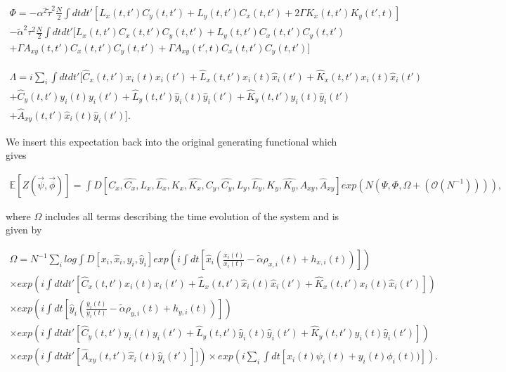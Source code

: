 \documentclass[.../main.tex]{subfiles}
\begin{document}
\begin{equation}
	\begin{split}
		\Phi = - \alpha^2 \tilde{\tau}^2 \frac{N}{2} \int dt dt'[L_x(t, t')C_y(t, t')
		+ L_y(t, t')C_x(t, t') + 2 \Gamma K_x(t, t') K_y(t', t)] \\
	- \tilde{\alpha}^2 \tau^2 \frac{N}{2} \int dtdt' [L_x(t, t') C_x(t, t') C_y(t, t') + L_y(t, t')
	C_x(t, t') C_y(t, t') \\ + \Gamma A_{xy}(t, t') C_x(t, t') C_y(t, t') + \Gamma A_{xy}(t', t) C_x
	(t, t') C_y(t, t')] 
\end{split}
\end{equation}

\begin{equation}
	\begin{split}
		\Lambda = i \sum_i \int dt dt'[\hat{C}_x(t, t') x_i(t) x_i(t') + \hat{L}_x(t, t') \hat{x}_i
		(t)\hat{x}_i(t') + \hat{K}_x(t, t') x_i(t) \hat{x}_i(t') \\ + \hat{C}_y(t, t') y_i(t) y_i
		(t') +
		\hat{L}_y(t, t') \hat{y}_i
		(t)\hat{y}_i(t') + \hat{K}_y(t, t') y_i(t) \hat{y}_i(t') \\ 
		+ \hat{A}_{xy}(t, t') \hat{x}_i(t) \hat{y}_i(t')].
	\end{split}
\end{equation}

We insert this expectation back into the original generating functional which gives

\begin{equation}
	\begin{split}
		\mathbb{E}[Z(\Vec{\psi}, \Vec{\phi})] = \int D[C_x, \hat{C_x}, L_x, \hat{L_x}, K_x, 
		\hat{K_x}, C_y, \hat{C_y}, L_y, \hat{L_y}, K_y, 
		\hat{K_y}, A_{xy}, \hat{A}_{xy}] 
		exp(N(\Psi, \Phi, \Omega + (\mathcal{O}(N^{-1})))),
	\end{split}
\end{equation}

where $\Omega$ includes all terms describing the time evolution of the system and is given by

\begin{equation}
	\begin{split}
		\Omega = N^{-1} \sum_i log \int D[x_i, \hat{x}_i, y_i, \hat{y}_i] exp(i
		\int dt[\hat{x}_i
		(\frac{\dot{x_i}(t)}{x_i(t)}
			- \tilde{\alpha} \rho_{x, i}(t) + h_{x, i}(t))]) 
			\\
		\times exp(i\int dt dt'[\hat{C}_x(t, t') x_i(t) x_i(t') + \hat{L}_x(t, t') \hat{x}_i
		(t)\hat{x}_i(t') + \hat{K}_x(t, t') x_i(t) \hat{x}_i(t')])\\
		\times exp(i \int dt[\hat{y}_i
		(\frac{\dot{y_i}(t)}{y_i(t)} 
			- \tilde{\alpha} \rho_{y, i}(t) + h_{y, i}(t))])\\
		\times exp(i \int dt dt' [\hat{C}_y(t, t') y_i(t) y_i
		(t') +
		\hat{L}_y(t, t') \hat{y}_i
		(t)\hat{y}_i(t') + \hat{K}_y(t, t') y_i(t) \hat{y}_i(t')])\\
		\times exp(i \int dt dt'[\hat{A}_{xy}(t, t') \hat{x}_i(t) \hat{y}_i(t')]])
			\times exp(i \sum_i
		\int dt[x_i(t) \psi_i(t) + y_i(t) \phi_i(t))]).
	\end{split}
\end{equation}
\end{document}
